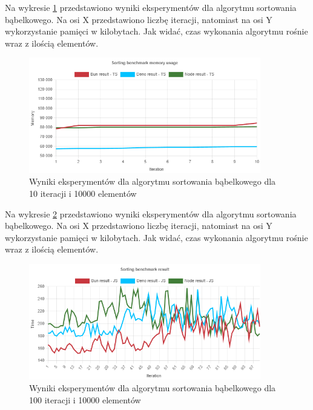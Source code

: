 Na wykresie \ref{fig:bubble_sorting_e4_memory_ts} przedstawiono wyniki eksperymentów dla algorytmu sortowania bąbelkowego. Na osi X przedstawiono liczbę iteracji, natomiast na osi Y wykorzystanie pamięci w kilobytach. Jak widać, czas wykonania algorytmu rośnie wraz z ilością elementów.
\begin{figure}[H]
  \centering
  \includegraphics[width=0.9\textwidth]{Figures/sorting/bubble/e4_memory_ts.png}
  \caption{Wyniki eksperymentów dla algorytmu sortowania bąbelkowego dla 10 iteracji i 10000 elementów}
  \label{fig:bubble_sorting_e4_memory_ts}
\end{figure}

Na wykresie \ref{fig:bubble_sorting_e5} przedstawiono wyniki eksperymentów dla algorytmu sortowania bąbelkowego. Na osi X przedstawiono liczbę iteracji, natomiast na osi Y wykorzystanie pamięci w kilobytach. Jak widać, czas wykonania algorytmu rośnie wraz z ilością elementów.
\begin{figure}[H]
  \centering
  \includegraphics[width=0.9\textwidth]{Figures/sorting/bubble/e5_js.png}
  \caption{Wyniki eksperymentów dla algorytmu sortowania bąbelkowego dla 100 iteracji i 10000 elementów}
  \label{fig:bubble_sorting_e5}
\end{figure}

